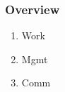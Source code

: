 






















 




\begin{frame}
\frametitle{Overview} 
\begin{enumerate} 
\item Work 
\item Mgmt
\item Comm 
\end{enumerate} 
\end{frame} 

